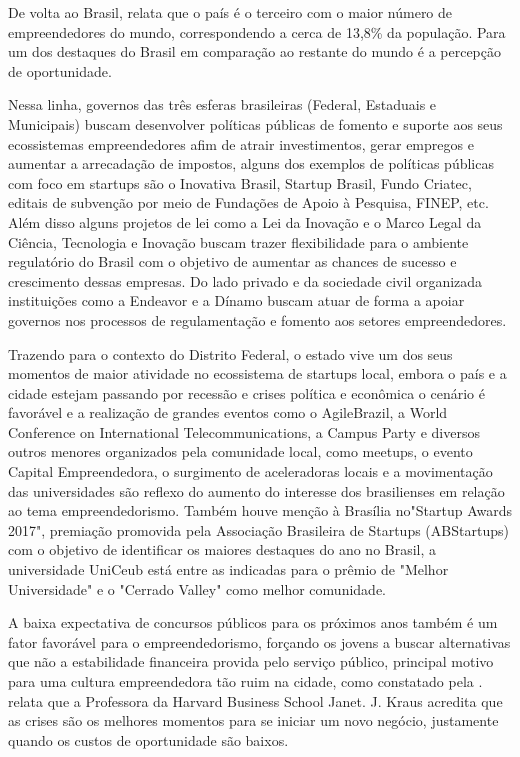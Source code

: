 De volta ao Brasil,  relata que o país é o terceiro com o maior número de empreendedores do mundo, correspondendo a cerca de 13,8\% da população. Para  um dos destaques do Brasil em comparação ao restante do mundo é a percepção de oportunidade.

Nessa linha, governos das três esferas brasileiras (Federal, Estaduais e Municipais) buscam desenvolver políticas públicas de fomento e suporte aos seus ecossistemas empreendedores afim de atrair investimentos, gerar empregos e aumentar a arrecadação de impostos, alguns dos exemplos de políticas públicas com foco em startups são o Inovativa Brasil, Startup Brasil, Fundo Criatec, editais de subvenção por meio de Fundações de Apoio à Pesquisa, FINEP, etc. Além disso alguns projetos de lei como a Lei da Inovação e o Marco Legal da Ciência, Tecnologia e Inovação buscam trazer flexibilidade para o ambiente regulatório do Brasil com o objetivo de aumentar as chances de sucesso e crescimento dessas empresas. Do lado privado e da sociedade civil organizada instituições como a Endeavor e a Dínamo buscam atuar de forma a apoiar governos nos processos de regulamentação e fomento aos setores empreendedores.

Trazendo para o contexto do Distrito Federal, o estado vive um dos seus momentos de maior atividade no ecossistema de startups local, embora o país e a cidade estejam passando por recessão e crises política e econômica o cenário é favorável e a realização de grandes eventos como o AgileBrazil, a World Conference on International Telecommunications, a Campus Party e diversos outros menores organizados pela comunidade local, como meetups, o evento Capital Empreendedora, o surgimento de aceleradoras locais e a movimentação das universidades são reflexo do aumento do interesse dos brasilienses em relação ao tema empreendedorismo. Também houve menção à Brasília no"Startup Awards 2017", premiação promovida pela Associação Brasileira de Startups (ABStartups) com o objetivo de identificar os maiores destaques do ano no Brasil, a universidade UniCeub está entre as indicadas para o prêmio de "Melhor Universidade" e o "Cerrado Valley" como melhor comunidade.

A baixa expectativa de concursos públicos para os próximos anos também é um fator favorável para o empreendedorismo, forçando os jovens a buscar alternativas que não a estabilidade financeira provida pelo serviço público, principal motivo para uma cultura empreendedora tão ruim na cidade, como constatado pela .  relata que a Professora da Harvard Business School Janet. J. Kraus acredita que as crises são os melhores momentos para se iniciar um novo negócio, justamente quando os custos de oportunidade são baixos. 

